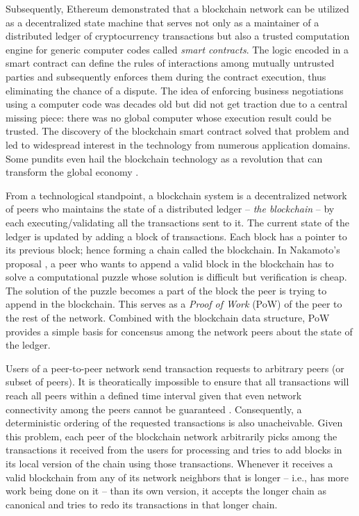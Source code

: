 \documentclass[conference]{IEEEtran}
\begin{document}
Subsequently, Ethereum \cite{Wood2014EthereumAS} demonstrated that a blockchain network can be utilized as a decentralized state machine that serves not only as a maintainer of a distributed ledger of cryptocurrency transactions but also a trusted computation engine for generic computer codes called \textit{smart contracts}. The logic encoded in a smart contract can define the rules of interactions among mutually untrusted parties and subsequently enforces them during the contract execution, thus eliminating the chance of a dispute. The idea of enforcing business negotiations using a computer code was decades old \cite{FM548} but did not get traction due to a central missing piece: there was no global computer whose execution result could be trusted. The discovery of the blockchain smart contract solved that problem and led to widespread interest in the technology from numerous application domains. Some pundits even hail the blockchain technology as a revolution that can transform the global economy \cite{blockchainRevolution1} \cite{blockchainRevolution2}.

From a technological standpoint, a blockchain system is a decentralized network of peers who maintains the state of a distributed ledger -- \textit{the blockchain} -- by each executing/validating all the transactions sent to it. The current state of the ledger is updated by adding a block of transactions. Each block has a pointer to its previous block; hence forming a chain called the blockchain. In Nakamoto's proposal \cite{bitcoin}, a peer who wants to append a valid block in the blockchain has to solve a computational puzzle whose solution is difficult but verification is cheap. The solution of the puzzle becomes a part of the block the peer is trying to append in the blockchain. This serves as a \textit{Proof of Work} (PoW) \cite{Back02hashcash} of the peer to the rest of the network. Combined with the blockchain data structure, PoW provides a simple basis for concensus \cite{Barborak:1993:CPF:152610.152612} among the network peers about the state of the ledger.

Users of a peer-to-peer network send transaction requests to arbitrary peers (or subset of peers). It is theoratically impossible to ensure that all transactions will reach all peers within a defined time interval given that even network connectivity among the peers cannot be guaranteed \cite{Fischer1983TheCP}. Consequently, a deterministic ordering of the requested transactions is also unacheivable. Given this problem, each peer of the blockchain network arbitrarily picks among the transactions it received from the users for processing  and tries to add blocks in its local version of the chain using those transactions. Whenever it receives a valid blockchain from any of its network neighbors that is longer -- i.e., has more work being done on it -- than its own version, it accepts the longer chain as canonical and tries to redo its transactions in that longer chain. 
\end{document}
